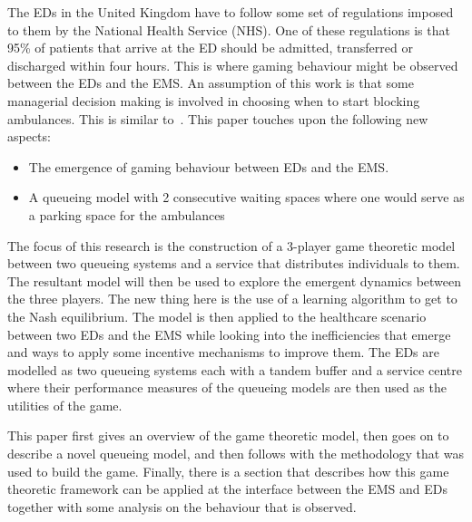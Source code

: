 The EDs in the United Kingdom have to follow some set of regulations imposed to 
them by the National Health Service (NHS).
One of these regulations is that 95\% of patients that arrive at the ED should 
be admitted, transferred or discharged within four hours.
This is where gaming behaviour might be observed between the EDs and the EMS.
An assumption of this work is that some managerial decision making is involved
in choosing when to start blocking ambulances.
This is similar to~\cite{deo2011centralized}.
This paper touches upon the following new aspects:
\begin{itemize}
    \item The emergence of gaming behaviour between EDs and the EMS.
    \item A queueing model with 2 consecutive waiting spaces where one would 
    serve as a parking space for the ambulances
\end{itemize}
The focus of this research is the construction of a 3-player game theoretic 
model between two queueing systems and a service that distributes individuals
to them. 
The resultant model will then be used to explore the emergent dynamics between 
the three players.
The new thing here is the use of a learning algorithm to get to the Nash 
equilibrium.
The model is then applied to the healthcare scenario between two EDs and the 
EMS while looking into the inefficiencies that emerge and ways to apply some 
incentive mechanisms to improve them.
The EDs are modelled as two queueing systems each with a tandem buffer and a 
service centre where their performance measures of the queueing models are then
used as the utilities of the game.

This paper first gives an overview of the game theoretic model, then goes on 
to describe a novel queueing model, and then follows with the methodology that 
was used to build the game.
Finally, there is a section that describes how this game theoretic framework
can be applied at the interface between the EMS and EDs together with some 
analysis on the behaviour that is observed.
